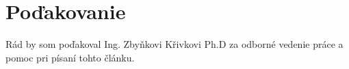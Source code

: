 \documentclass[slovak]{ExcelAtFIT} %
\begin{document}
\section*{Poďakovanie}
Rád by som poďakoval Ing. Zbyňkovi Křivkovi Ph.D za odborné vedenie práce a pomoc pri písaní tohto článku.




\end{document}
